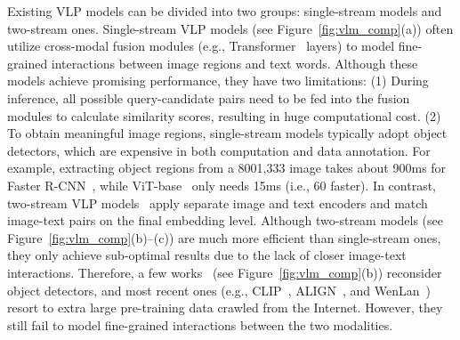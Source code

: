 \documentclass[10pt,twocolumn,letterpaper]{article}
\begin{document}
Existing VLP models can be divided into two groups: single-stream models and two-stream ones. Single-stream VLP models (see Figure~\ref{fig:vlm_comp}(a)) often utilize cross-modal fusion modules (e.g., Transformer~\cite{vaswani2017attention} layers) to model fine-grained interactions between image regions and text words. Although these models achieve promising performance, they have two limitations: (1) During inference, all possible query-candidate pairs need to be fed into the fusion modules to calculate similarity scores, resulting in huge computational cost. (2) To obtain meaningful image regions, single-stream models typically adopt object detectors, which are expensive in both computation and data annotation. For example, extracting object regions from a 8001,333 image takes about 900ms for Faster R-CNN~\cite{ren2015faster}, while ViT-base~\cite{dosovitskiy2021an} only needs 15ms (i.e., 60 faster).
In contrast, two-stream VLP models~\cite{kiros2014unifying, wang2016learning} apply separate image and text encoders and match image-text pairs on the final embedding level. Although two-stream models (see Figure~\ref{fig:vlm_comp}(b)--(c)) are much more efficient than single-stream ones, they only achieve sub-optimal results due to the lack of closer image-text interactions. Therefore, a few works~\cite{wu2019learning, sun2021lightningdot} (see Figure~\ref{fig:vlm_comp}(b)) reconsider object detectors, and most recent ones (e.g., CLIP~\cite{radford2021learning}, ALIGN~\cite{jia2021scaling}, and WenLan~\cite{huo2021wenlan}) resort to extra large pre-training data crawled from the Internet. However, they still fail to model fine-grained interactions between the two modalities.
\end{document}
